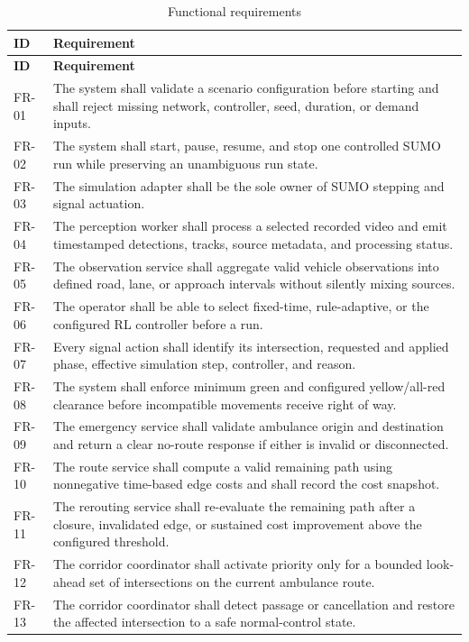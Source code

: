 \begin{longtable}{p{}p{}}
\caption{Functional requirements}\label{tab:functional-requirements}\\
\toprule
\textbf{ID} & \textbf{Requirement}\\
\midrule\endfirsthead
\toprule
\textbf{ID} & \textbf{Requirement}\\
\midrule\endhead
FR-01 & The system shall validate a scenario configuration before starting and shall reject missing network, controller, seed, duration, or demand inputs.\\
FR-02 & The system shall start, pause, resume, and stop one controlled SUMO run while preserving an unambiguous run state.\\
FR-03 & The simulation adapter shall be the sole owner of SUMO stepping and signal actuation.\\
FR-04 & The perception worker shall process a selected recorded video and emit timestamped detections, tracks, source metadata, and processing status.\\
FR-05 & The observation service shall aggregate valid vehicle observations into defined road, lane, or approach intervals without silently mixing sources.\\
FR-06 & The operator shall be able to select fixed-time, rule-adaptive, or the configured RL controller before a run.\\
FR-07 & Every signal action shall identify its intersection, requested and applied phase, effective simulation step, controller, and reason.\\
FR-08 & The system shall enforce minimum green and configured yellow/all-red clearance before incompatible movements receive right of way.\\
FR-09 & The emergency service shall validate ambulance origin and destination and return a clear no-route response if either is invalid or disconnected.\\
FR-10 & The route service shall compute a valid remaining path using nonnegative time-based edge costs and shall record the cost snapshot.\\
FR-11 & The rerouting service shall re-evaluate the remaining path after a closure, invalidated edge, or sustained cost improvement above the configured threshold.\\
FR-12 & The corridor coordinator shall activate priority only for a bounded look-ahead set of intersections on the current ambulance route.\\
FR-13 & The corridor coordinator shall detect passage or cancellation and restore the affected intersection to a safe normal-control state.\\

\end{longtable}
